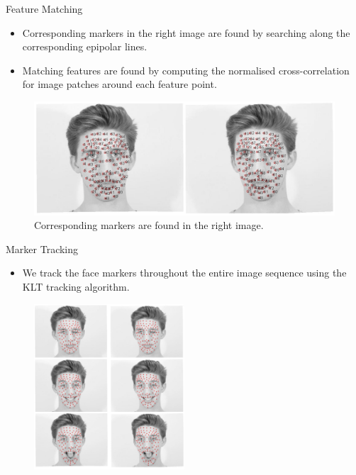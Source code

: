 \documentclass{beamer}
\begin{document}
\begin{frame}{Feature Matching}

\begin{itemize}
\setlength\itemsep{0.5em}
\item Corresponding markers in the right image are found by searching along the corresponding epipolar lines.
\item Matching features are found by computing the normalised cross-correlation for image patches around each feature point.
\end{itemize}

\begin{center}
\begin{figure}
\includegraphics[width=1.0\textwidth]{img/matching}
\caption{\tiny{Corresponding markers are found in the right image.}}
\end{figure}
\end{center}

\end{frame}



\begin{frame}{Marker Tracking}

\begin{itemize}
\setlength\itemsep{0.5em}
\item We track the face markers throughout the entire image sequence using the KLT tracking algorithm.
\end{itemize}

\begin{center}
\begin{figure}
\includegraphics[width=0.5\textwidth]{img/tracking}
\end{figure}
\end{center}

\end{frame}
\end{document}
